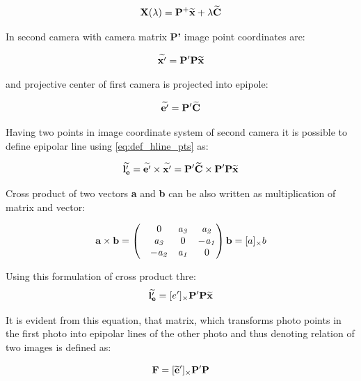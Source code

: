 \documentclass[a4paper,12pt]{article}
\newcommand{\ematr}[1]{
{\bf #1}
}
\newcommand{\evect}[1]{
{\bf #1}
}
\newcommand{\ehvect}[1]{
{\bf \widetilde{#1}}
}
\newcommand{\escal}[1]{
{\it #1}
}
\begin{document}
\begin{equation}
\ematr{X}(\escal{\lambda}) = \ematr{P}^{+}\ehvect{x} + \escal{\lambda}\ehvect{C}
\end{equation}

In second camera with camera matrix \ematr{P'} image point coordinates are:

\begin{equation}
\ehvect{x'} =  \ematr{P'}\ematr{P}\ehvect{x}
\end{equation}

and projective center of first camera is projected into epipole: 

\begin{equation}
\ehvect{e'} =  \ematr{P'}\ehvect{C}
\end{equation}

Having two points in image coordinate system of second camera it is possible to define epipolar line using \eqref{eq:def_hline_pts} as:

\begin{equation}
\ehvect{l'_{e}} =  \ehvect{e'} \times \ehvect{x'} = \ematr{P'}\ehvect{C} \times \ematr{P'}\ematr{P}\ehvect{x}
\end{equation}

Cross product of two vectors \evect{a} and \evect{b} can be also written as multiplication of matrix and vector:

\begin{equation}
\evect{a}  \times \evect{b}  = 
\begin{pmatrix}
   & 0      & \escal{a_{3}}   & \escal{a_{2}}\\
   & \escal{a_{3}}  & 0               & \escal{-a_{1}}\\
   & \escal{-a_{2}} & \escal{a_{1}}   & 0\\
\end{pmatrix}
\evect{b} = [a]_{\times} b
\end{equation}

Using this formulation of cross product thre:
\begin{equation}
\ehvect{l'_{e}}  = [e']_{\times} \ematr{P'}\ematr{P}\ehvect{x}
\end{equation}

It is evident from this equation, that matrix, which transforms photo points in the first photo into 
epipolar lines of the other photo and thus denoting relation of two images is defined as:

\begin{equation}
\ematr{F}  = [\ehvect{e}']_{\times} \ematr{P'}\ematr{P}
\end{equation}
\end{document}

